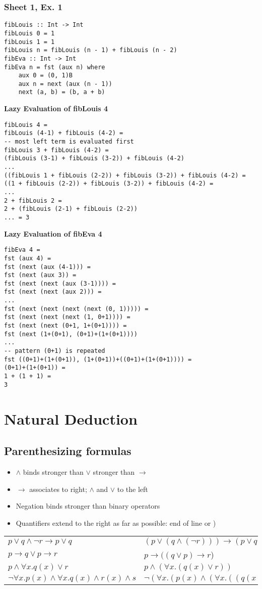 \documentclass[11.5pt]{article}
\def\li{\rightarrow}
\def\fax{\forall x.}
\begin{document}
\subsubsection{Sheet 1, Ex. 1}
\begin{verbatim}
fibLouis :: Int -> Int
fibLouis 0 = 1
fibLouis 1 = 1
fibLouis n = fibLouis (n - 1) + fibLouis (n - 2)
fibEva :: Int -> Int
fibEva n = fst (aux n) where 
    aux 0 = (0, 1)B
    aux n = next (aux (n - 1))
    next (a, b) = (b, a + b)
\end{verbatim}
\textbf{Lazy Evaluation of fibLouis 4}
\begin{verbatim}
fibLouis 4 =
fibLouis (4-1) + fibLouis (4-2) =
-- most left term is evaluated first
fibLouis 3 + fibLouis (4-2) =
(fibLouis (3-1) + fibLouis (3-2)) + fibLouis (4-2) 
...
((fibLouis 1 + fibLouis (2-2)) + fibLouis (3-2)) + fibLouis (4-2) =
((1 + fibLouis (2-2)) + fibLouis (3-2)) + fibLouis (4-2) =
...
2 + fibLouis 2 =
2 + (fibLouis (2-1) + fibLouis (2-2))
... = 3
\end{verbatim}
\textbf{Lazy Evaluation of fibEva 4}
\begin{verbatim}
fibEva 4 =
fst (aux 4) =
fst (next (aux (4-1))) =
fst (next (aux 3)) =
fst (next (next (aux (3-1)))) =
fst (next (next (aux 2))) =
...
fst (next (next (next (next (0, 1))))) =
fst (next (next (next (1, 0+1)))) =
fst (next (next (0+1, 1+(0+1)))) =
fst (next (1+(0+1), (0+1)+(1+(0+1)))) 
...
-- pattern (0+1) is repeated
fst ((0+1)+(1+(0+1)), (1+(0+1))+((0+1)+(1+(0+1)))) =
(0+1)+(1+(0+1)) =
1 + (1 + 1) =
3
\end{verbatim}

\section{Natural Deduction}
\subsection{Parenthesizing formulas} 
\begin{itemize}
    \item $\land$ binds stronger than $\lor$ stronger than $\li$
    \item $\li$ associates to right; $\land$ and $\lor$ to the left
    \item Negation binds stronger than binary operators 
    \item Quantifiers extend to the right as far as possible: end of line or )
\end{itemize}
\begin{tabular}{l l}
    $p \lor q \land \lnot r \li p \lor q$ & $(p \lor (q \land (\lnot r))) \li (p \lor q)$ \\
    $p \li q \lor p \li r$ & $p \li ((q \lor p) \li r$) \\
    $p \land \fax q(x) \lor r$ & $p \land (\fax (q(x) \lor r))$ \\
    $\lnot \fax p(x) \land \fax q(x) \land r(x) \land s$ &  $\lnot( \fax (p(x) \land (\fax ((q(x) \land r(x)) \land s))))$
\end{tabular} 
\end{document}
